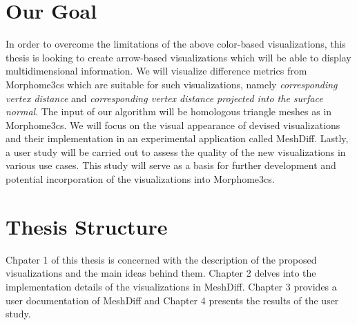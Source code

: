 \section*{Our Goal}

In order to overcome the limitations of the above color-based visualizations, this thesis is looking to create arrow-based visualizations which will be able to display multidimensional information. We will visualize difference metrics from Morphome3cs which are suitable for such visualizations, namely {\it corresponding vertex distance} and {\it corresponding vertex distance projected into the surface normal}. The input of our algorithm will be homologous triangle meshes as in Morphome3cs. We will focus on the visual appearance of devised visualizations and their implementation in an experimental application called MeshDiff. Lastly, a user study will be carried out to assess the quality of the new visualizations in various use cases. This study will serve as a basis for further development and potential incorporation of the visualizations into Morphome3cs.
\section*{Thesis Structure}

Chpater 1 of this thesis is concerned with the description of the proposed visualizations and the main ideas behind them. Chapter 2 delves into the implementation details of the visualizations in MeshDiff. Chapter 3 provides a user documentation of MeshDiff and Chapter 4 presents the results of the user study.